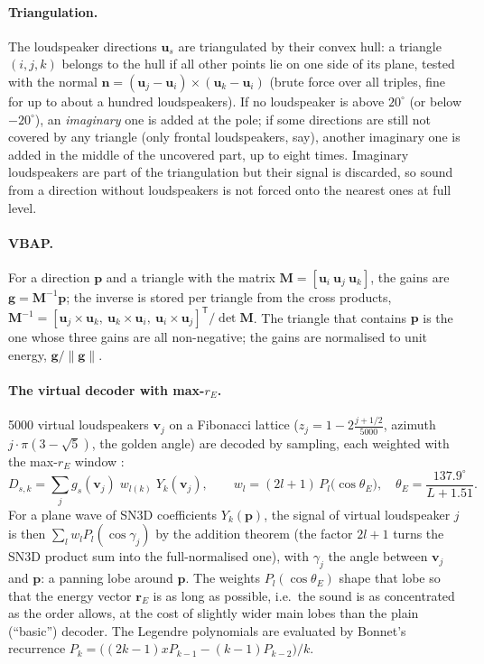 \paragraph{Triangulation.} The loudspeaker directions $\mathbf u_s$ are triangulated by their convex hull: a triangle
$(i,j,k)$ belongs to the hull if all other points lie on one side of its plane, tested with the normal
$\mathbf n = (\mathbf u_j-\mathbf u_i)\times(\mathbf u_k-\mathbf u_i)$ (brute force over all triples, fine for up to about
a hundred loudspeakers). If no loudspeaker is above $20^\circ$ (or below $-20^\circ$), an \emph{imaginary} one is added
at the pole; if some directions are still not covered by any triangle (only frontal loudspeakers, say), another
imaginary one is added in the middle of the uncovered part, up to eight times. Imaginary loudspeakers are part of the
triangulation but their signal is discarded, so sound from a direction without loudspeakers is not forced onto the
nearest ones at full level.

\paragraph{VBAP.} For a direction $\mathbf p$ and a triangle with the matrix $\mathbf M = [\mathbf u_i\ \mathbf u_j\
\mathbf u_k]$, the gains are $\mathbf g = \mathbf M^{-1}\mathbf p$; the inverse is stored per triangle from the cross
products, $\mathbf M^{-1} = [\mathbf u_j\times\mathbf u_k,\ \mathbf u_k\times\mathbf u_i,\ \mathbf u_i\times\mathbf u_j]^{\mathsf T}/
\det\mathbf M$. The triangle that contains $\mathbf p$ is the one whose three gains are all non-negative; the gains
are normalised to unit energy, $\mathbf g/\lVert\mathbf g\rVert$.

\paragraph{The virtual decoder with max-$r_E$.} 5000 virtual loudspeakers $\mathbf v_j$ on a Fibonacci lattice
($z_j = 1-2\frac{j+1/2}{5000}$, azimuth $j\cdot\pi(3-\sqrt5)$, the golden angle) are decoded by sampling, each weighted
with the max-$r_E$ window \citep{zotter2019}:
\begin{equation}
  D_{s,k} = \sum_j g_{s}(\mathbf v_j)\; w_{l(k)}\; Y_k(\mathbf v_j),\qquad
  w_l = (2l+1)\,P_l\bigl(\cos\theta_E\bigr),\quad \theta_E = \frac{137.9^\circ}{L+1.51}.
\end{equation}
For a plane wave of SN3D coefficients $Y_k(\mathbf p)$, the signal of virtual loudspeaker $j$ is then
$\sum_l w_l P_l(\cos\gamma_j)$ by the addition theorem (the factor $2l+1$ turns the SN3D product sum into the
full-normalised one), with $\gamma_j$ the angle between $\mathbf v_j$ and $\mathbf p$: a panning lobe around
$\mathbf p$. The weights $P_l(\cos\theta_E)$ shape that lobe so that the energy vector $\mathbf r_E$ is as long as
possible, i.e.\ the sound is as concentrated as the order allows, at the cost of slightly wider main lobes than the
plain (\enquote{basic}) decoder. The Legendre polynomials are evaluated by Bonnet's recurrence
$P_k = \bigl((2k-1)xP_{k-1}-(k-1)P_{k-2}\bigr)/k$.

